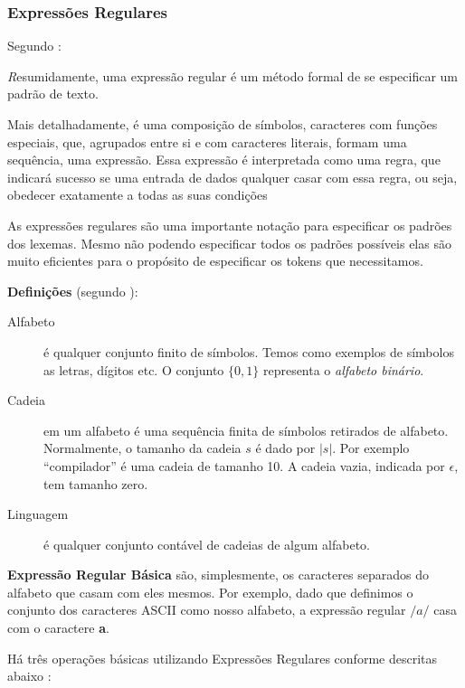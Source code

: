 \subsubsection{Expressões Regulares}
\label{sec:regex}

Segundo :
\begin{citacao}{4cm}{0cm} \footnotesize \emph
	Resumidamente, uma expressão regular é um método formal de se especificar um padrão de texto.

	Mais detalhadamente, é uma composição de símbolos, caracteres com funções
	especiais, que, agrupados entre si e com caracteres literais, formam uma
	sequência, uma expressão. Essa expressão é interpretada como uma regra, que
	indicará sucesso se uma entrada de dados qualquer casar com essa regra, ou
	seja, obedecer exatamente a todas as suas condições
\end{citacao}

As expressões regulares são uma importante notação para especificar os padrões
dos lexemas. Mesmo não podendo especificar todos os padrões possíveis elas são
muito eficientes para o propósito de especificar os tokens que necessitamos.

\textbf{Definições} (segundo ):
\begin{description}
	\item[Alfabeto] é qualquer conjunto finito de símbolos. Temos como exemplos
		de símbolos as letras, dígitos etc. O conjunto $\{0, 1\}$ representa o
		\emph{alfabeto binário}.
	\item[Cadeia] em um alfabeto é uma sequência finita de símbolos retirados de
		alfabeto. Normalmente, o tamanho da cadeia $s$ é dado por $|s|$. Por
		exemplo ``compilador'' é uma cadeia de tamanho 10. A cadeia vazia,
		indicada por $\epsilon$, tem tamanho zero.
	\item[Linguagem] é qualquer conjunto contável de cadeias de algum alfabeto.
\end{description}

\textbf{Expressão Regular Básica} são, simplesmente, os caracteres separados do
alfabeto que casam com eles mesmos. Por exemplo, dado que definimos o conjunto
dos caracteres ASCII como nosso alfabeto, a expressão regular $/a/$ casa com o
caractere \textbf{a}.

Há três operações básicas utilizando Expressões Regulares conforme descritas
abaixo \cite{louden97-pt}:

